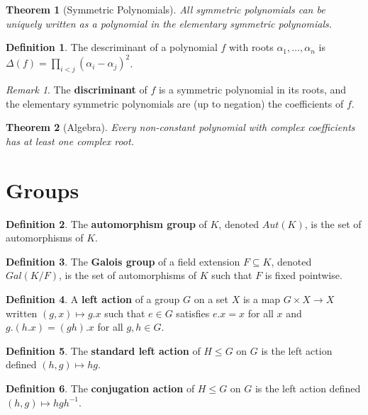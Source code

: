 \documentclass[
    parskip=half,
    toc=flat,
    toc=sectionentrydotfill,
]{scrartcl}  %
\theoremstyle{definition}
\newtheorem{definition}{Definition}[section]
\theoremstyle{plain}
\newtheorem{theorem}{Theorem}[section]
\theoremstyle{remark}
\newtheorem{remark}{Remark}[section]
\begin{document}
\begin{theorem}[Symmetric Polynomials]
    All symmetric polynomials can be uniquely written as a polynomial in the
    elementary symmetric polynomials.
\end{theorem}

\begin{definition}
    The descriminant of a polynomial $f$ with roots $\alpha_1,\dots,\alpha_n$
    is $\Delta(f)=\prod_{i<j}(\alpha_i-\alpha_j)^2$.
\end{definition}

\begin{remark}
    The \textbf{discriminant} of $f$ is a symmetric polynomial in its roots,
    and the elementary symmetric polynomials are (up to negation) the
    coefficients of $f$.
\end{remark}

\begin{theorem}[Algebra]
    Every non-constant polynomial with complex coefficients has at least one
    complex root.
\end{theorem}


\section{Groups}


\begin{definition}
    The \textbf{automorphism group} of $K$, denoted $Aut(K)$, is the set of
    automorphisms of $K$.
\end{definition}

\begin{definition}
    The \textbf{Galois group} of a field extension $F\subseteq K$, denoted
    $Gal(K/F)$, is the set of automorphisms of $K$ such that $F$ is fixed
    pointwise.
\end{definition}

\begin{definition}
    A \textbf{left action} of a group $G$ on a set $X$ is a map
    $G\times X\to X$ written $(g,x)\mapsto g.x$ such that $e\in G$ satisfies
    $e.x=x$ for all $x$ and $g.(h.x)=(gh).x$ for all $g,h\in G$.
\end{definition}

\begin{definition}
    The \textbf{standard left action} of $H\leq G$ on $G$ is the left action
    defined $(h,g)\mapsto hg$.
\end{definition}

\begin{definition}
    The \textbf{conjugation action} of $H\leq G$ on $G$ is the left action
    defined $(h,g)\mapsto hgh^{-1}$.
\end{definition}
\end{document}
